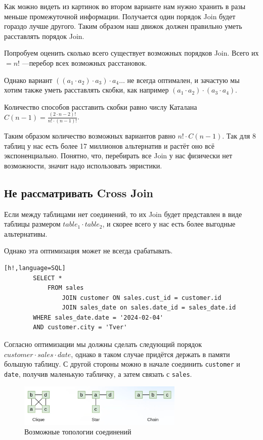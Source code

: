 \documentclass[11pt]{article}
\begin{document}
    Как можно видеть из картинок во втором варианте нам нужно хранить в разы меньше промежуточной информации.
    Получается один порядок Join будет гораздо лучше другого.
    Таким образом наш движок должен правильно уметь расставлять порядок Join.

    Попробуем оценить сколько всего существует возможных порядков Join.
    Всего их $= n!$ ---перебор всех возможных расстановок.

    Однако вариант $((a_1 \cdot a_2) \cdot a_3) \cdot a_4 \dots$ не всегда оптимален,
    и зачастую мы хотим также уметь расставлять скобки, как например $(a_1 \cdot a_2) \cdot (a_3 \cdot a_4)$.

    Количество способов расставить скобки равно числу Каталана $C(n-1) = \frac{(2 \cdot n - 2)!}{n! \cdot (n-1)!}$.

    Таким образом количество возможных вариантов равно $n! \cdot C(n-1)$.
    Так для 8 таблиц у нас есть более 17 миллионов альтернатив и растёт оно всё экспоненциально.
    Понятно, что, перебирать все Join у нас физически нет возможности, значит надо использовать эвристики.

    \subsection{Не рассматривать Cross Join}

    Если между таблицами нет соединений, то их Join будет представлен в виде таблицы размером $table_1 \cdot table_2$,
    и скорее всего у нас есть более выгодные альтернативы.

    Однако эта оптимизация может не всегда срабатывать.
    \newpage

    \begin{lstlisting}[h!,language=SQL]
        SELECT *
            FROM sales
                JOIN customer ON sales.cust_id = customer.id
                JOIN sales_date on sales.date_id = sales_date.id
        WHERE sales_date.date = '2024-02-04'
        AND customer.city = 'Tver'
    \end{lstlisting}

    Согласно оптимизации мы должны сделать следующий порядок $customer \cdot sales \cdot date$,
    однако в таком случае придётся держать в памяти большую таблицу.
    С другой стороны можно в начале соединить \texttt{customer} и \texttt{date}, получив маленькую табличку,
    а затем связать с \texttt{sales}.

    \begin{figure}[h!]
        \centering
        \includegraphics[width=0.7\textwidth]{Pictures/Cross Join/Topology}
        \caption{Возможные топологии соединений}
    \end{figure}
\end{document}
